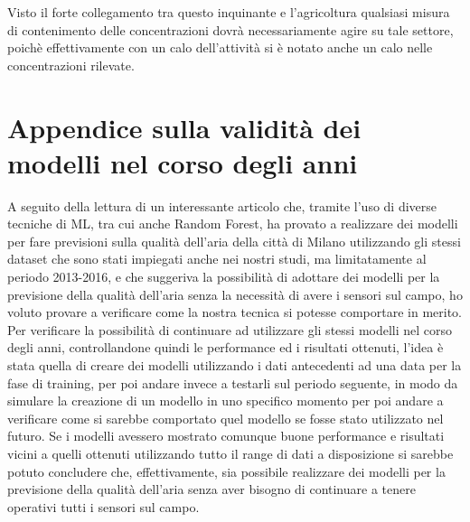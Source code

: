 \documentclass[a4paper]{report}
\begin{document}
Visto il forte collegamento tra questo inquinante e l'agricoltura qualsiasi misura di contenimento delle concentrazioni dovrà necessariamente agire su tale settore, poichè effettivamente con un calo dell'attività si è notato anche un calo nelle concentrazioni rilevate.

\chapter{Appendice sulla validità dei modelli nel corso degli anni}
A seguito della lettura di un interessante articolo \cite{app10134587} che, tramite l'uso di diverse tecniche di ML, tra cui anche Random Forest, ha provato a realizzare dei modelli per fare previsioni sulla qualità dell'aria della città di Milano utilizzando gli stessi dataset che sono stati impiegati anche nei nostri studi, ma limitatamente al periodo 2013-2016, e che suggeriva la possibilità di adottare dei modelli per la previsione della qualità dell'aria senza la necessità di avere i sensori sul campo, ho voluto provare a verificare come la nostra tecnica si potesse comportare in merito.
Per verificare la possibilità di continuare ad utilizzare gli stessi modelli nel corso degli anni, controllandone quindi le performance ed i risultati ottenuti, l'idea è stata quella di creare dei modelli utilizzando i dati antecedenti ad una data per la fase di training, per poi andare invece a testarli sul periodo seguente, in modo da simulare la creazione di un modello in uno specifico momento per poi andare a verificare come si sarebbe comportato quel modello se fosse stato utilizzato nel futuro. Se i modelli avessero mostrato comunque buone performance e risultati vicini a quelli ottenuti utilizzando tutto il range di dati a disposizione si sarebbe potuto concludere che, effettivamente, sia possibile realizzare dei modelli per la previsione della qualità dell'aria senza aver bisogno di continuare a tenere operativi tutti i sensori sul campo.  
\end{document}
